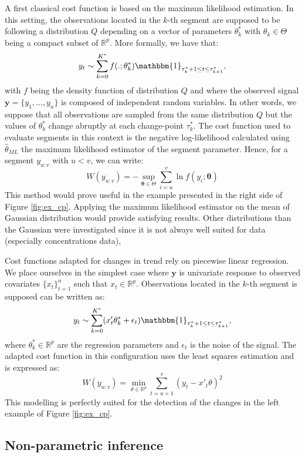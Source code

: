A first classical cost function is based on the maximum likelihood estimation. In this setting, the observations located in the $k$-th segment are supposed to be following a distribution $Q$ depending on a vector of parameters $\theta^*_k$ with $\theta_k \in \Theta$ being a compact subset of $\mathbb{R}^p$. More formally, we have that:
\begin{equation}
y_t \sim \sum_{k=0}^{K^*}f(.;\theta^*_k)\mathbbm{1}_{\tau^*_{k}+1\leq t \leq \tau^*_{k+1}},
\end{equation}
with $f$ being the density function of distribution $Q$ and where the observed signal $\bm y =\{y_1,\dots,y_n\}$ is composed of independent random variables. In other words, we suppose that all observations are sampled from the same distribution $Q$ but the values of $\theta^*_k$ change abruptly at each change-point $\tau^*_k$. The cost function used to evaluate segments in this context is the negative log-likelihood calculated using $\hat\theta_{ML}$ the maximum likelihood estimator of the segment parameter. Hence, for a segment $y_{u:v}$ with $u < v$, we can write:  
\begin{equation}
W(y_{u:v}) = -\sup_{\bm \theta \in \Theta} \sum_{i = u}^{v} \ln f(y_i; \bm \theta)
\end{equation}
This method would prove useful in the example presented in the right side of Figure \ref{fig:ex_cp}. Applying the maximum likelihood estimator on the mean of Gaussian distribution would provide satisfying results. Other distributions than the Gaussian were investigated since it is not always well suited for data (especially concentrations data),  

Cost functions adapted for changes in trend rely on piecewise linear regression. We place ourselves in the simplest case where $\bm y$ is univariate response to observed covariates $\{x_t\}_{t=1}^n$ such that $x_t \in \mathbb{R}^p$. Observations located in the $k$-th segment is supposed can be written as:   
$$y_t \sim \sum_{k=0}^{K^*}(x'_t\theta^*_k + \epsilon_t)\mathbbm{1}_{\tau^*_{k}+1\leq t \leq \tau^*_{k+1}},$$
where $\theta^*_k \in \mathbb{R}^p$ are the regression parameters and $\epsilon_t$ is the noise of the signal. The adapted cost function in this configuration uses the least squares estimation and is expressed as:
$$W(y_{u:v}) = \min_{\theta \in \mathbb{R}^p}\sum_{t=u+1}^v(y_t-x'_t\theta)^2$$ 
This modelling is perfectly suited for the detection of the changes in the left example of Figure \ref{fig:ex_cp}. 

\subsection{Non-parametric inference}

